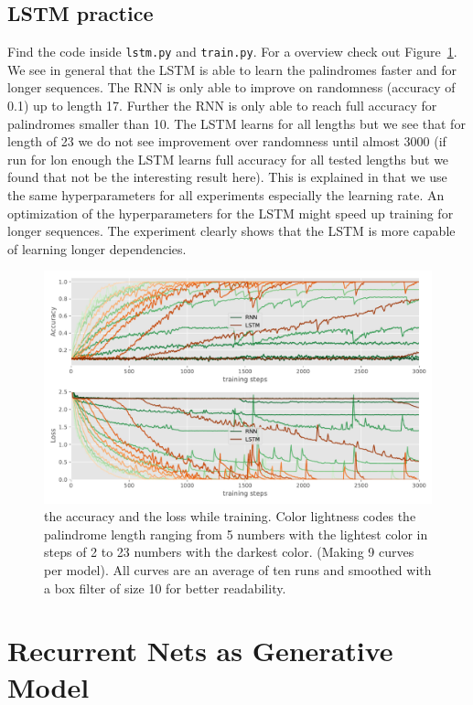 \documentclass{article}
\begin{document}
\subsection{LSTM practice}\label{sub:lstm_practice}
Find the code inside \texttt{lstm.py} and \texttt{train.py}.
For a overview check out Figure~\ref{fig:accuracy_loss}.
We see in general that the LSTM is able to learn the palindromes faster and for longer sequences.
The RNN is only able to improve on randomness (accuracy of 0.1) up to length 17.
Further the RNN is only able to reach full accuracy for palindromes smaller than 10.
The LSTM learns for all lengths but we see that for length of 23 we do not see improvement over randomness until almost 3000
(if run for lon enough the LSTM learns full accuracy for all tested lengths but we found that not be the interesting result here).
This is explained in that we use the same hyperparameters for all experiments especially the learning rate.
An optimization of the hyperparameters for the LSTM might speed up training for longer sequences.
The experiment clearly shows that the LSTM is more capable of learning longer dependencies.

\begin{figure}
  \centering
  \includegraphics[width=\linewidth]{assignment_2/part1/palindrome.pdf}
  \caption{ the accuracy and  the loss while training.
  Color lightness codes the palindrome length ranging from 5 numbers with the lightest color in steps of 2 to 23 numbers with the darkest color.
  (Making 9 curves per model). All curves are an average of ten runs and smoothed with a box filter of size 10 for better readability.}\label{fig:accuracy_loss}
\end{figure}

\section{Recurrent Nets as Generative Model}
\end{document}
